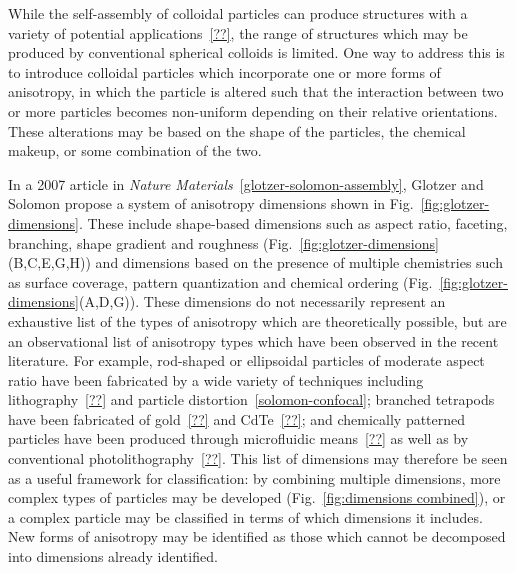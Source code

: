 While the self-assembly of colloidal particles can produce structures with a variety of potential applications~\ref{??}, 
the range of structures which may be produced by conventional spherical colloids is limited.  One way to address this is to 
introduce colloidal particles which incorporate one or more forms of anisotropy, in which the 
particle is altered such that the interaction between two or more particles becomes non-uniform depending on 
their relative orientations.  These alterations may be based on the shape of the particles, the chemical makeup, or 
some combination of the two.

In a 2007 article in \textit{Nature Materials}~\ref{glotzer-solomon-assembly}, Glotzer and Solomon propose a system of anisotropy 
dimensions shown in Fig.~\ref{fig:glotzer-dimensions}. These include shape-based dimensions such as aspect 
ratio, faceting, branching, shape gradient 
and roughness (Fig.~\ref{fig:glotzer-dimensions}(B,C,E,G,H)) and dimensions based on the presence of
multiple chemistries such as surface coverage, pattern quantization and chemical ordering 
(Fig.~\ref{fig:glotzer-dimensions}(A,D,G)).  These dimensions do not necessarily 
represent an exhaustive list of the types
of anisotropy which are theoretically possible, but are an observational list of anisotropy types which have been observed in the
recent literature.  For example, rod-shaped or ellipsoidal particles of moderate aspect ratio have been fabricated 
by a wide variety of techniques including lithography~\ref{??} and particle distortion~\ref{solomon-confocal}; branched 
tetrapods have been fabricated of gold~\ref{??} and CdTe~\ref{??}; and chemically patterned particles have been produced
through microfluidic means~\ref{??} as well as by conventional photolithography~\ref{??}.  This list of dimensions may therefore
be seen as a useful framework for classification: by combining multiple dimensions, more complex types of particles may be 
developed (Fig.~\ref{fig:dimensions combined}), or a complex particle may be classified in terms of which dimensions it includes.
New forms of anisotropy may be identified as those which cannot be decomposed into dimensions already identified.

